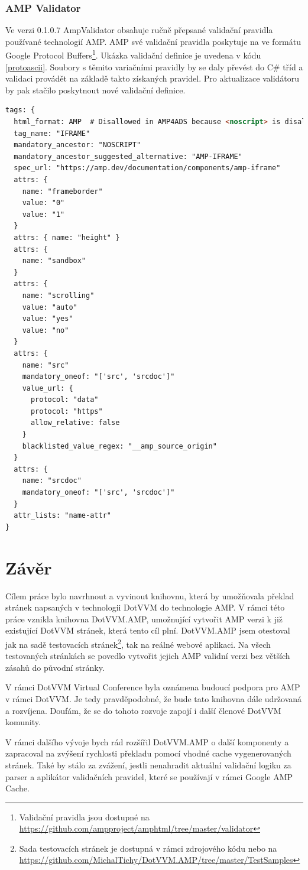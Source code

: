 \subsection{AMP Validator}
Ve verzi 0.1.0.7 AmpValidator obsahuje ručně přepsané validační pravidla používané technologií AMP. AMP své validační pravidla poskytuje na ve formátu Google Protocol Buffers\footnote{Validační pravidla jsou dostupné na \url{https://github.com/ampproject/amphtml/tree/master/validator}}. Ukázka validační definice je uvedena v kódu \ref{protoascii}\cite{validatorGit}.  Soubory s těmito variačními pravidly by se daly převést do C\# tříd a validaci provádět na základě takto získaných pravidel. Pro aktualizace validátoru by pak stačilo poskytnout nové validační definice.

\begin{lstlisting}[language=html, caption=Ukázka části validačního pravidla pro iframe v rámci protoascii souboru.,label=protoascii,captionpos=t]
tags: {
  html_format: AMP  # Disallowed in AMP4ADS because <noscript> is disallowed.
  tag_name: "IFRAME"
  mandatory_ancestor: "NOSCRIPT"
  mandatory_ancestor_suggested_alternative: "AMP-IFRAME"
  spec_url: "https://amp.dev/documentation/components/amp-iframe"
  attrs: {
    name: "frameborder"
    value: "0"
    value: "1"
  }
  attrs: { name: "height" }
  attrs: {
    name: "sandbox"
  }
  attrs: {
    name: "scrolling"
    value: "auto"
    value: "yes"
    value: "no"
  }
  attrs: {
    name: "src"
    mandatory_oneof: "['src', 'srcdoc']"
    value_url: {
      protocol: "data"
      protocol: "https"
      allow_relative: false
    }
    blacklisted_value_regex: "__amp_source_origin"
  }
  attrs: {
    name: "srcdoc"
    mandatory_oneof: "['src', 'srcdoc']"
  }
  attr_lists: "name-attr"
}
\end{lstlisting}

\chapter{Závěr}
Cílem práce bylo navrhnout a vyvinout knihovnu, která by umožňovala překlad stránek napsaných v technologii DotVVM do technologie AMP. V rámci této práce vznikla knihovna DotVVM.AMP, umožnující vytvořit AMP verzi k již existující DotVVM stránek, která tento cíl plní. DotVVM.AMP jsem otestoval jak na sadě testovacích stránek\footnote{ Sada testovacích stránek je dostupná v rámci zdrojového kódu nebo na \url{https://github.com/MichalTichy/DotVVM.AMP/tree/master/TestSamples}}, tak na reálné webové aplikaci. Na všech testovaných stránkách se povedlo vytvořit jejich AMP validní verzi bez větších zásahů do původní stránky.

V rámci DotVVM Virtual Conference byla oznámena budoucí podpora pro AMP v rámci DotVVM. Je tedy pravděpodobné, že bude tato knihovna dále udržovaná a rozvíjena\cite{herceg_2020}.  Doufám, že se do tohoto rozvoje zapojí i další členové DotVVM komunity.

V rámci dalšího vývoje bych rád rozšířil DotVVM.AMP o další komponenty a zapracoval na zvýšení rychlosti překladu pomocí vhodné cache vygenerovaných stránek. Také by stálo za zvážení, jestli nenahradit aktuální validační logiku za parser a aplikátor validačních pravidel, které se používají v rámci Google AMP Cache.